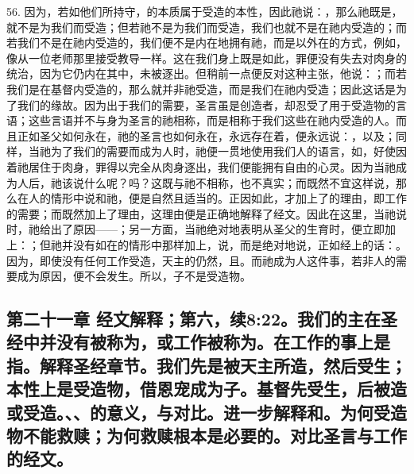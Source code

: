56. 因为，若如他们所持守，的本质属于受造的本性，因此祂说：，那么祂既是，就不是为我们而受造；但若祂不是为我们而受造，我们也就不是在祂内受造的；而若我们不是在祂内受造的，我们便不是内在地拥有祂，而是以外在的方式，例如，像从一位老师那里接受教导一样。这在我们身上既是如此，罪便没有失去对肉身的统治，因为它仍内在其中，未被逐出。但稍前一点便反对这种主张，他说：；而若我们是在基督内受造的，那么就并非祂受造，而是我们在祂内受造；因此这话是为了我们的缘故。因为出于我们的需要，圣言虽是创造者，却忍受了用于受造物的言语；这些言语并不与身为圣言的祂相称，而是相称于我们这些在祂内受造的人。而且正如圣父如何永在，祂的圣言也如何永在，永远存在着，便永远说：，以及；同样，当祂为了我们的需要而成为人时，祂便一贯地使用我们人的语言，如，好使因着祂居住于肉身，罪得以完全从肉身逐出，我们便能拥有自由的心灵。因为当祂成为人后，祂该说什么呢？吗？这既与祂不相称，也不真实；而既然不宜这样说，那么在人的情形中说和祂，便是自然且适当的。正因如此，才加上了的理由，即工作的需要；而既然加上了理由，这理由便是正确地解释了经文。因此在这里，当祂说时，祂给出了原因——；另一方面，当祂绝对地表明从圣父的生育时，便立即加上：；但祂并没有如在的情形中那样加上，说，而是绝对地说，正如经上的话：。因为，即使没有任何工作受造，天主的仍然，且。而祂成为人这件事，若非人的需要成为原因，便不会发生。所以，子不是受造物。\par


\subsection{第二十一章 经文解释；第六，续8:22。我们的主在圣经中并没有被称为，或工作被称为。在工作的事上是指。解释圣经章节。我们先是被天主所造，然后受生；本性上是受造物，借恩宠成为子。基督先受生，后被造或受造。、、的意义，与对比。进一步解释和。为何受造物不能救赎；为何救赎根本是必要的。对比圣言与工作的经文。}

